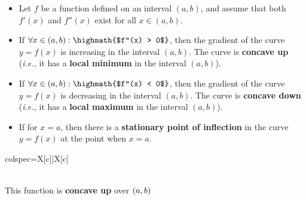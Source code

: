 \documentclass[12pt,a4paper,titlepage]{article}
\DeclarePairedDelimiter {\pars}  {  (      }     {  )      }
\begin{document}
            \begin{SummaryBox}[title=Second derivative of a function (concavity), leftlower=0pt, rightlower=0pt]
                \begin{itemize}[leftmargin=*]
                    \item Let $f$ be a function defined on an interval $(a,b)$, and assume that both $f'(x)$ and $f''(x)$ exist for all $x \in (a,b)$.
                    \item If $\forall x \in (a,b): \highmath{$f''(x) > 0$}$, then the gradient of the curve $y=f(x)$ is increasing in the interval $(a,b)$. The curve is \textbf{concave up} (\textit{i.e.,} it has a \textbf{local minimum} in the interval $(a,b)$).
                    \item If $\forall x \in (a,b): \highmath{$f''(x) < 0$}$, then the gradient of the curve $y=f(x)$ is decreasing in the interval $(a,b)$. The curve is \textbf{concave down} (\textit{i.e.,} it has a \textbf{local maximum} in the interval $(a,b)$).
                    \item If  for $x=a$, then there is a \textbf{stationary point of inflection} in the curve $y=f(x)$ at the point when $x=a$.
                \end{itemize}
                \tcblower
                \begin{tblr}{colspec={X[c]|X[c]}}
                    {\\
                    This function is \textbf{concave up} over $\pars*{a, b}$}
                    

\end{tblr}
\end{SummaryBox}
\end{document}
